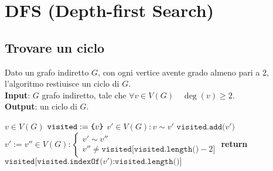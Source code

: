 \documentclass[14pt]{extreport}
\theoremstyle{definition}
\theoremstyle{definition}
\begin{document}
\section{DFS (Depth-first Search)}

\subsection{Trovare un ciclo}

\begin{algorithm}[H]
    \caption{
        Dato un grafo indiretto $G$, con ogni vertice avente grado almeno pari a $2$, l'algoritmo restiuisce un ciclo di $G$.\\
        \textbf{Input}: $G$ grafo indiretto, tale che $\forall v \in V(G) \quad \deg(v) \ge 2$.\\
        \textbf{Output}: un ciclo di $G$.
    }

    \begin{algorithmic}[1]
            \State $v \in V(G)$ 
            \State $\texttt{visited} := \verb|{|v\verb|}|$ 
            \State $v' \in V(G) : v \sim v'$
             
                \State $\texttt{visited.add(}v'\texttt{)}$
                \State $v' := v'' \in V(G) : \left \{ \begin{array}{l}v' \sim v'' \\ v'' \neq \texttt{visited[visited.length()} - 2\texttt{]} \end{array} \right.$
            \EndWhile
            \State \textbf{return} $\texttt{visited[visited.indexOf(}v'\texttt{)} \texttt{:} \texttt{visited.length()]}$
        \EndFunction
    \end{algorithmic}
\end{algorithm}
\end{document}
